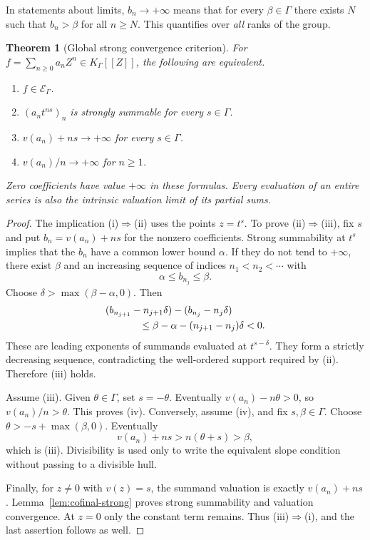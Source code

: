 \documentclass[11pt,letterpaper]{article}
\numberwithin{equation}{section}
\newtheorem{theorem}{Theorem}[section]
\theoremstyle{definition}
\theoremstyle{remark}
\begin{document}
In statements about limits, $b_n\to+\infty$ means that for every
$\beta\in\Gamma$ there exists $N$ such that $b_n>\beta$ for all $n\ge N$.
This quantifies over \emph{all} ranks of the group.

\begin{theorem}[Global strong convergence criterion]\label{thm:criterion}
For $f=\sum_{n\ge0}a_nZ^n\in K_\Gamma[[Z]]$, the following are equivalent.
\begin{enumerate}[label=(\roman*)]
\item $f\in\mathcal E_\Gamma$.
\item $(a_nt^{ns})_n$ is strongly summable for every $s\in\Gamma$.
\item $v(a_n)+ns\to+\infty$ for every $s\in\Gamma$.
\item $v(a_n)/n\to+\infty$ for $n\ge1$.
\end{enumerate}
Zero coefficients have value $+\infty$ in these formulas. Every evaluation
of an entire series is also the intrinsic valuation limit of its partial sums.
\end{theorem}
\begin{proof}
The implication (i)$\Rightarrow$(ii) uses the points $z=t^s$.
To prove (ii)$\Rightarrow$(iii), fix $s$ and put
$b_n=v(a_n)+ns$ for the nonzero coefficients. Strong summability at $t^s$
implies that the $b_n$ have a common lower bound $\alpha$. If they do not tend
to $+\infty$, there exist $\beta$ and an increasing sequence of indices
$n_1<n_2<\cdots$ with
\[
 \alpha\le b_{n_j}\le\beta.
\]
Choose $\delta>\max(\beta-\alpha,0)$. Then
\begin{align*}
 &(b_{n_{j+1}}-n_{j+1}\delta)-(b_{n_j}-n_j\delta)\\
 &\hspace{12mm}\le\beta-\alpha-(n_{j+1}-n_j)\delta<0.
\end{align*}
These are leading exponents of summands evaluated at $t^{s-\delta}$. They form
a strictly decreasing sequence, contradicting the well-ordered support
required by (ii). Therefore (iii) holds.

Assume (iii). Given $\theta\in\Gamma$, set $s=-\theta$. Eventually
$v(a_n)-n\theta>0$, so $v(a_n)/n>\theta$. This proves (iv).
Conversely, assume (iv), and fix $s,\beta\in\Gamma$. Choose
$\theta>-s+\max(\beta,0)$. Eventually
\[
 v(a_n)+ns>n(\theta+s)>\beta,
\]
which is (iii). Divisibility is used only to write the equivalent slope
condition without passing to a divisible hull.

Finally, for $z\ne0$ with $v(z)=s$, the summand valuation is exactly
$v(a_n)+ns$. Lemma~\ref{lem:cofinal-strong} proves strong summability and
valuation convergence. At $z=0$ only the constant term remains. Thus
(iii)$\Rightarrow$(i), and the last assertion follows as well.
\end{proof}
\end{document}
